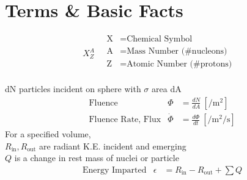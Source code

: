 \section{Terms \& Basic Facts}
\begin{equation*}
X^A_Z \quad \!
\begin{aligned}
    \text{X} &= \text{Chemical Symbol} \\
    \text{A} &= \text{Mass Number (\# nucleons)} \\
    \text{Z} &= \text{Atomic Number (\# protons)} \\
\end{aligned}
\end{equation*}

dN particles incident on sphere with $\sigma$ area dA
\begin{align*}
&\text{Fluence} & \Phi &= \frac{dN}{dA} ~ [\si{\per\square\meter}] \\
&\text{Fluence Rate, Flux} & \dot{\Phi} &= \frac{d\Phi}{dt} ~ [\si{\per\square\meter\per\second}]
\end{align*}
For a specified volume, \\
$R_\text{in}, R_\text{out}$ are radiant K.E. incident and emerging \\
$Q$ is a change in rest mass of nuclei or particle
\begin{align*}
&\text{Energy Imparted} & \epsilon &= R_\text{in} - R_\text{out} + \sum Q
\end{align*}